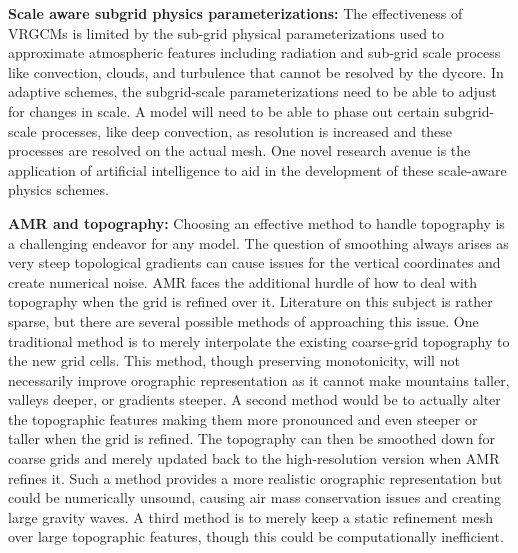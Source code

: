  \vspace{6pt}
\textbf{Scale aware subgrid physics parameterizations:}
The effectiveness of VRGCMs is limited by the sub-grid physical parameterizations used to
approximate atmospheric features including radiation and sub-grid scale process like convection, 
clouds, and turbulence that cannot be resolved by the dycore.
In adaptive schemes, the subgrid-scale parameterizations need to be able to adjust for changes in scale.  
A model will need to be able to phase out certain subgrid-scale processes, like deep
convection, as resolution is increased and these processes are resolved on the actual mesh.
One novel research avenue is the application of artificial intelligence to aid in the development of
these scale-aware physics schemes.

\vspace{6pt}
\textbf{AMR and topography:}
Choosing an effective method to handle topography is a challenging endeavor for any model. 
The question of smoothing always arises as very steep topological gradients can cause issues 
for the vertical coordinates and create numerical noise.  AMR faces the additional hurdle of how to deal 
with topography when the grid is refined over it.  Literature on this subject is rather sparse, but there are 
several possible methods of approaching this issue.  One traditional method is to merely interpolate the
 existing coarse-grid topography to the new grid cells.  This method, though preserving monotonicity, will not necessarily 
 improve orographic representation as it cannot make mountains taller, valleys deeper, or gradients steeper.   
 A second method would be to actually alter the topographic features making them more pronounced 
 and even steeper or taller when the grid is refined.  The topography can then be smoothed down for 
 coarse grids and merely updated back to the high-resolution version when AMR refines it.  
 Such a method provides a more realistic orographic representation but could be numerically 
 unsound, causing air mass conservation issues and creating large gravity waves.  A third method 
 is to merely keep a static refinement mesh over large topographic features, though this 
 could be computationally inefficient.